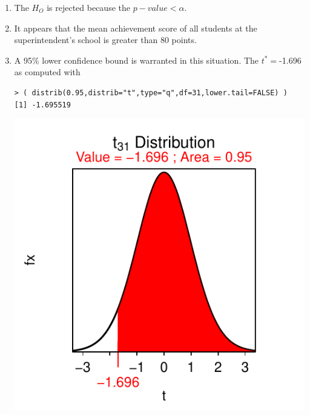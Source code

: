 \documentclass[10pt,openany]{book}\usepackage[]{graphicx}\usepackage[]{color}
\makeatletter
\newenvironment{kframe}{%
 \def\at@end@of@kframe{}%
 \ifinner\ifhmode%
  \def\at@end@of@kframe{\end{minipage}}%
  \begin{minipage}{\columnwidth}%
 \fi\fi%
 \def\FrameCommand##1{\hskip\@totalleftmargin \hskip-\fboxsep
 \colorbox{shadecolor}{##1}\hskip-\fboxsep
     \hskip-\linewidth \hskip-\@totalleftmargin \hskip\columnwidth}%
 \MakeFramed {\advance\hsize-\width
   \@totalleftmargin\z@ \linewidth\hsize
   \@setminipage}}%
 {\par\unskip\endMakeFramed%
 \at@end@of@kframe}
\newenvironment{knitrout}{}{} %
\makeatother
\begin{document}
\begin{itemize}
\begin{enumerate}
\begin{knitrout}
{}



\end{knitrout}
      \item The $H_{O}$ is rejected because the $p-value<\alpha$.
      \item It appears that the mean achievement score of all students at the superintendent's school is greater than 80 points.
      \item A 95\% lower confidence bound is warranted in this situation.  The $t^{*}=$-1.696 as computed with
\begin{knitrout}
\color{fgcolor}\begin{kframe}
\begin{verbatim}
> ( distrib(0.95,distrib="t",type="q",df=31,lower.tail=FALSE) )
[1] -1.695519
\end{verbatim}
\end{kframe}

{\centering \includegraphics[width=.4\linewidth]{Figs/unnamed-chunk-361-1} 

}




\end{knitrout}
\end{enumerate}
\end{itemize}
\end{document}
